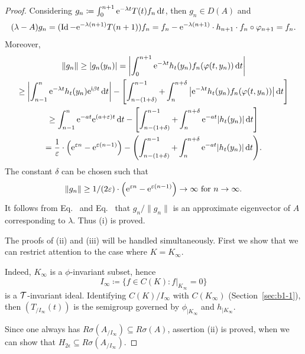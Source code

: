 \begin{proof}
	Considering $g_{n}\coloneq \int_{0}^{n+1} \mathrm{e}^{-\lambda t} T(t)f_{n} \mathop{}\!\mathrm{d}{t}$, then $g_{n} \in D(A)$ and
	\begin{equation}\label{eq:b3-4.7}
		(\lambda - A)g_{n} = (\Id - \eu^{-\lambda(n+1)}T(n+1))f_{n} = f_{n} - \eu^{-\lambda(n+1)} \cdot h_{n+1} \cdot f_{n} \circ \phi_{n+1} = f_{n}.
	\end{equation}
	Moreover,
	\begin{multline*}
	\|g_{n}\| \geq |g_{n}(y_{n})| = \left|\int_{0}^{n+1} \eu^{-\lambda t} h_{t}(y_{n})f_{n}(\phi(t,y_{n})) \dt \right| \\
	\geq \left|\int_{n-1}^{n} \eu^{-\lambda t} h_{t}(y_{n}) \eu^{\im\beta  t} \dt\right| - \left[\int_{n-(1+\delta)}^{n-1} + \int_{n}^{n+\delta}\left| \eu^{-\lambda t}h_{t}(y_{n})f_{n}(\phi(t,y_{n}))\right| \dt\right] \\
	\geq \int_{n-1}^{n} \eu^{-at} \eu^{(a+\epsilon)t} \dt - \left[\int_{n-(1+\delta)}^{n-1} + \int_{n}^{n+\delta} \eu^{-at}|h_{t}(y_{n})| \dt\right] \\
	= \frac{1}{\epsilon}\cdot\left(\eu^{\epsilon n} - \eu^{\epsilon(n-1)}\right) - \mleft(\int_{n-(1+\delta)}^{n-1} + \int_{n}^{n+\delta} \eu^{-at}|h_{t}(y_{n})| \dt\mright) .
	\end{multline*}
	The constant $\delta$ can be chosen such that
	\begin{equation}\label{eq:b3-4.8}
		\|g_{n}\| \geq 1/(2\epsilon)\cdot\left(\eu^{\epsilon n} - \eu^{\epsilon(n-1)}\right) \to \infty \text{ for } n \to \infty.
	\end{equation}
	It follows from Eq.~ and Eq.~ that $ g_n / \|g_n\|$ is an approximate
	eigenvector of\/ $A$ corresponding to $\lambda$. 
    Thus (i) is proved. 
	
	The 
	proofs of (ii) and (iii) will be handled simultaneously. 
    First we show that we can restrict attention to the case where $K = K_\infty$.
	
	Indeed, $K_{\infty}$ is a $\phi$-invariant subset, hence \[
    I_{\infty}\coloneq \{f \in C(K) \colon f|_{K_{\infty}} = 0\}
    \]
    is a $\mathcal{T}$-invariant ideal.
	Identifying $C(K)/I_{\infty}$ with $C(K_{\infty})$ (\cf Section~\ref{sec:b1-1}), then $(T_{/I_{\infty}}(t))$ is the semigroup governed by $\phi_{|K_{\infty}}$ and $h_{|K_{\infty}}$.
    
	Since one always has $R\sigma(A_{/I_{\infty}}) \subseteq R{\sigma}(A)$, assertion (ii) is proved, 
	when we can show that $H_{2\epsilon} \subseteq R\sigma(A_{/I_{\infty}})$.
    

\end{proof}
